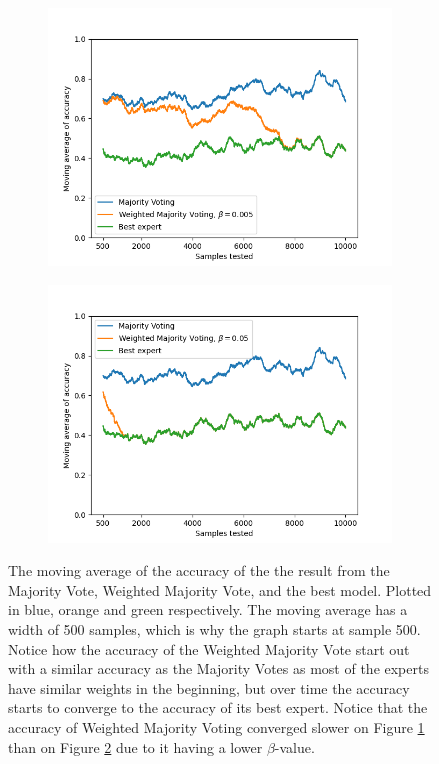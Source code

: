 \begin{figure}
    \begin{subfigure}{.5\textwidth}
        \centering
        \includegraphics[width=\linewidth]{figures/wmv-beta0_005.png}
        \caption{}
        \label{fig:wmv-over-time-beta-a}
    \end{subfigure}
    \begin{subfigure}{.5\textwidth}
        \centering
        \includegraphics[width=\linewidth]{figures/wmv-beta0_05.png}
        \caption{}
        \label{fig:wmv-over-time-beta-b}
    \end{subfigure}
    \caption{The moving average of the accuracy of the the result from the Majority Vote, Weighted Majority Vote, and the best model. Plotted in blue, orange and green respectively. The moving average has a width of 500 samples, which is why the graph starts at sample 500. Notice how the accuracy of the Weighted Majority Vote start out with a similar accuracy as the Majority Votes as most of the experts have similar weights in the beginning, but over time the accuracy starts to converge to the accuracy of its best expert. Notice that the accuracy of Weighted Majority Voting converged slower on Figure \ref{fig:wmv-over-time-beta-a} than on Figure \ref{fig:wmv-over-time-beta-b} due to it having a lower $\beta$-value.}
    \label{fig:example-votes}
\end{figure} \label{fig:wmv-over-time-beta}

